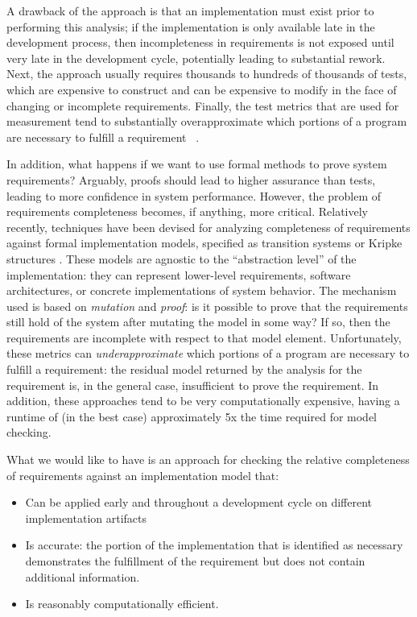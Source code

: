 A drawback of the approach is that an implementation must exist prior to performing this analysis; if the implementation is only available late in the development process, then incompleteness in requirements is not exposed until very late in the development cycle, potentially leading to substantial rework.  Next, the approach usually requires thousands to hundreds of thousands of tests, which are expensive to construct and can be expensive to modify in the face of changing or incomplete requirements.  Finally, the test metrics that are used for measurement tend to substantially overapproximate which portions of a program are necessary to fulfill a requirement~\cite{} .

In addition, what happens if we want to use formal methods to prove system requirements?  Arguably, proofs should lead to higher assurance than tests, leading to more confidence in system performance.  However, the problem of requirements completeness becomes, if anything, more critical.  Relatively recently,
%
%
techniques have been devised for analyzing completeness of requirements against formal implementation models, specified as transition systems or Kripke structures \cite{das2005formal, claessen2007coverage, grosse2007estimating}.  These models are agnostic to the ``abstraction level'' of the implementation: they can represent lower-level requirements, software architectures, or concrete implementations of system behavior.  The mechanism used is based on {\em mutation} and {\em proof}: is it possible to prove that the requirements still hold of the system after mutating the model in some way?  If so, then the requirements are incomplete with respect to that model element.  Unfortunately, these metrics can {\em underapproximate} which portions of a program are necessary to fulfill a requirement: the residual model returned by the analysis for the requirement is, in the general case, insufficient to prove the requirement.  In addition, these approaches tend to be very computationally expensive, having a runtime of (in the best case) approximately 5x the time required for model checking.

What we would like to have is an approach for checking the relative completeness of requirements against an implementation model that:
\begin{itemize}
    \item Can be applied early and throughout a development cycle on different implementation artifacts
    \item Is accurate: the portion of the implementation that is identified as necessary demonstrates the
        fulfillment of the requirement but does not contain additional information.
    \item Is reasonably computationally efficient.
\end{itemize}

